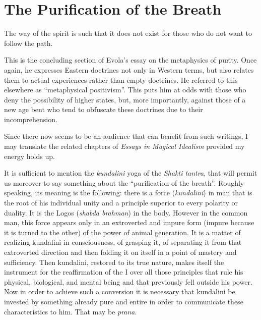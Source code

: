 \section{The Purification of the Breath}

\begin{quotex}
The way of the spirit is such that it does not exist for those who do not want to follow the path. 

This is the concluding section of Evola's essay on the metaphysics of purity. Once again, he expresses Eastern doctrines not only in Western terms, but also relates them to actual experiences rather than empty doctrines. He referred to this elsewhere as “metaphysical positivism”. This puts him at odds with those who deny the possibility of higher states, but, more importantly, against those of a new age bent who tend to obfuscate these doctrines due to their incomprehension.

Since there now seems to be an audience that can benefit from such writings, I may translate the related chapters of \emph{Essays in Magical Idealism} provided my energy holds up. 

\end{quotex}
It is sufficient to mention the \textit{kundalini} yoga of the \textit{Shakti tantra}, that will permit us moreover to say something about the “purification of the breath”. Roughly speaking, its meaning is the following: there is a force (\textit{kundalini}) in man that is the root of his individual unity and a principle superior to every polarity or duality. It is the Logos (\textit{shabda brahman}) in the body. However in the common man, this force appears only in an extroverted and impure form (impure because it is turned to the other) of the power of animal generation. It is a matter of realizing kundalini in consciousness, of grasping it, of separating it from that extroverted direction and then folding it on itself in a point of mastery and sufficiency. Then kundalini, restored to its true nature, makes itself the instrument for the reaffirmation of the I over all those principles that rule his physical, biological, and mental being and that previously fell outside his power. Now in order to achieve such a conversion it is necessary that kundalini be invested by something already pure and entire in order to communicate these characteristics to him. That may be \textit{prana}.

